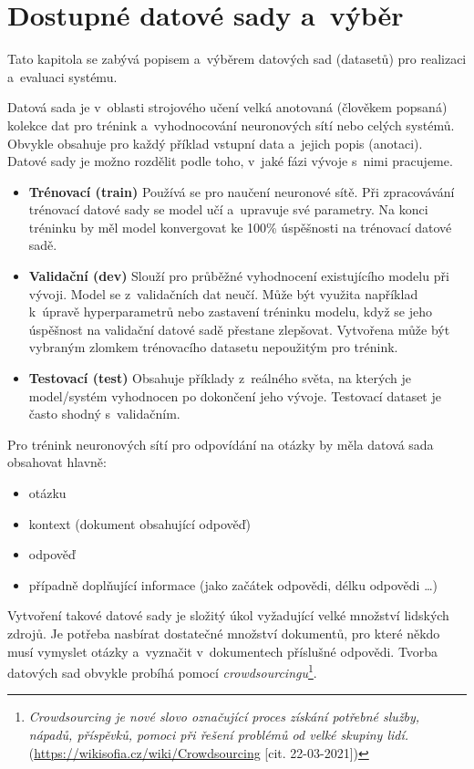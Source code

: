 \chapter{Dostupné datové sady a~výběr}
\label{available_datasets}
Tato kapitola se zabývá popisem a~výběrem datových sad (datasetů) pro realizaci a~evaluaci systému.\par
Datová sada je v~oblasti strojového učení velká anotovaná (člověkem popsaná) kolekce dat pro trénink a~vyhodnocování neuronových sítí nebo celých systémů. Obvykle obsahuje pro každý příklad vstupní data a~jejich popis (anotaci).\\
Datové sady je možno rozdělit podle toho, v~jaké fázi vývoje s~nimi pracujeme.
\begin{itemize}
    \item \textbf{Trénovací (train)} Používá se pro naučení neuronové sítě. Při zpracovávání trénovací datové sady se model učí a~upravuje své parametry. Na konci tréninku by měl model konvergovat ke 100\% úspěšnosti na trénovací datové sadě.
    \item \textbf{Validační (dev)} Slouží pro průběžné vyhodnocení existujícího modelu při vývoji. Model se z~validačních dat neučí. Může být využita například k~úpravě hyperparametrů nebo zastavení tréninku modelu, když se jeho úspěšnost na validační datové sadě přestane zlepšovat. Vytvořena může být vybraným zlomkem trénovacího datasetu nepoužitým pro trénink.
    \item \textbf{Testovací (test)} Obsahuje příklady z~reálného světa, na kterých je model/systém vyhodnocen po dokončení jeho vývoje. Testovací dataset je často shodný s~validačním.
\end{itemize}
Pro trénink neuronových sítí pro odpovídání na otázky by měla datová sada obsahovat hlavně:
\begin{itemize}
    \item otázku
    \item kontext (dokument obsahující odpověď)
    \item odpověď
    \item případně doplňující informace (jako začátek odpovědi, délku odpovědi \dots)
\end{itemize}
Vytvoření takové datové sady je složitý úkol vyžadující velké množství lidských zdrojů. Je potřeba nasbírat dostatečné množství dokumentů, pro které někdo musí vymyslet otázky a~vyznačit v~dokumentech příslušné odpovědi. Tvorba datových sad obvykle probíhá pomocí \emph{crowdsourcingu}\footnote{\emph{Crowdsourcing je nové slovo označující proces získání potřebné služby, nápadů, příspěvků, pomoci při řešení problémů od velké skupiny lidí.} (\url{https://wikisofia.cz/wiki/Crowdsourcing} [cit. 22-03-2021])}.

